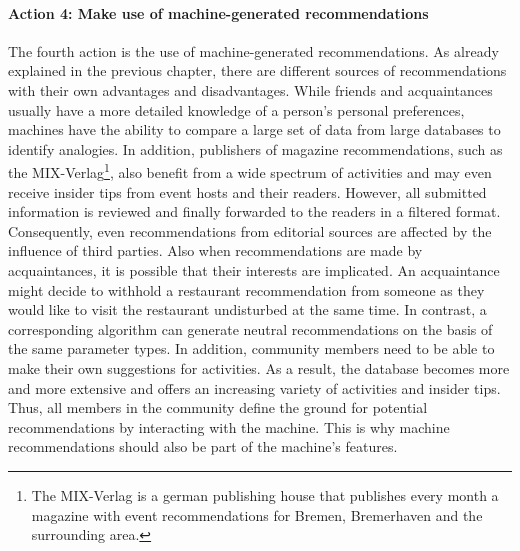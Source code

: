 \documentclass[12pt,numbers=noenddot,parskip,bibliography=totocnumbered,listof=totocnumbered]{scrreprt}
\begin{document}
\paragraph{Action 4: Make use of machine-generated recommendations}
The fourth action is the use of machine-generated recommendations. As already explained in the previous chapter, there are different sources of recommendations with their own advantages and disadvantages. While friends and acquaintances usually have a more detailed knowledge of a person's personal preferences, machines have the ability to compare a large set of data from large databases to identify analogies. In addition, publishers of magazine recommendations, such as the MIX-Verlag\footnote{The MIX-Verlag is a german publishing house that publishes every month a magazine with event recommendations for Bremen, Bremerhaven and the surrounding area.}, also benefit from a wide spectrum of activities and may even receive insider tips from event hosts and their readers. However, all submitted information is reviewed and finally forwarded to the readers in a filtered format. Consequently, even recommendations from editorial sources are affected by the influence of third parties. Also when recommendations are made by acquaintances, it is possible that their interests are implicated. An acquaintance might decide to withhold a restaurant recommendation from someone as they would like to visit the restaurant undisturbed at the same time.\newline
In contrast, a corresponding algorithm can generate neutral recommendations on the basis of the same parameter types. In addition, community members need to be able to make their own suggestions for activities. As a result, the database becomes more and more extensive and offers an increasing variety of activities and insider tips. Thus, all members in the community define the ground for potential recommendations by interacting with the machine. This is why machine recommendations should also be part of the machine's features.
\end{document}
